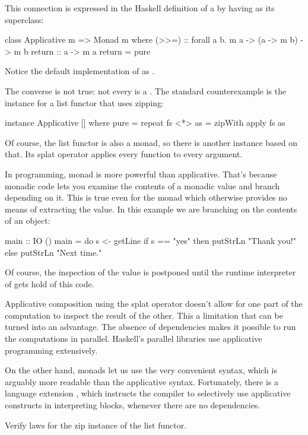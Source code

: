 \documentclass[DaoFP]{subfiles}
\begin{document}
This connection is expressed in the Haskell definition of a  by having  as its superclass:
\begin{haskell}
class Applicative m => Monad m where
    (>>=)       :: forall a b. m a -> (a -> m b) -> m b
    return      :: a -> m a
    return      = pure
\end{haskell}
Notice the default implementation of  as . 

The converse is not true: not every  is a . The standard counterexample is the  instance for a list functor that uses zipping:
\begin{haskell}
instance Applicative [] where
  pure = repeat
  fs <*> as = zipWith apply fs as
\end{haskell}
Of course, the list functor is also a monad, so there is another  instance based on that. Its splat operator applies every function to every argument.

In programming, monad is more powerful than applicative. That's because monadic code lets you examine the contents of a monadic value and branch depending on it. This is true even for the  monad which otherwise provides no means of extracting the value. In this example we are branching on the contents of an  object:
\begin{haskell}
main :: IO ()
main = do
  s <- getLine
  if s == "yes"
  then putStrLn "Thank you!"
  else putStrLn "Next time."
\end{haskell}
Of course, the inspection of the value is postponed until the runtime interpreter of  gets hold of this code. 

Applicative composition using the splat operator doesn't allow for one part of the computation to inspect the result of the other. This a limitation that can be turned into an advantage. The absence of dependencies makes it possible to run the computations in parallel.  Haskell's parallel libraries use applicative programming extensively.

On the other hand, monads let us use the very convenient  syntax, which is arguably more readable than the applicative syntax. Fortunately, there is a language extension , which instructs the compiler to selectively use applicative constructs in interpreting  blocks, whenever there are no dependencies.

\begin{exercise}
Verify  laws for the zip instance of the list functor.
\end{exercise}
\end{document}
